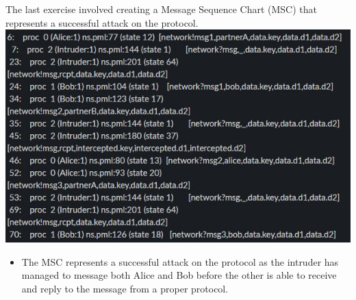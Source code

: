 \documentclass{article}
\theoremstyle{theorem}
\theoremstyle{definition}
\theoremstyle{remark}
\begin{document}
The last exercise involved creating a Message Sequence Chart (MSC) that represents a successful attack on the protocol.
\\ \includegraphics{Report Images/HW9_1.jpg}
\begin{itemize}
    \item The MSC represents a successful attack on the protocol as the intruder has managed to message both Alice and Bob before the other is able to receive and reply to the message from a proper protocol.
\end{itemize}
\end{document}
